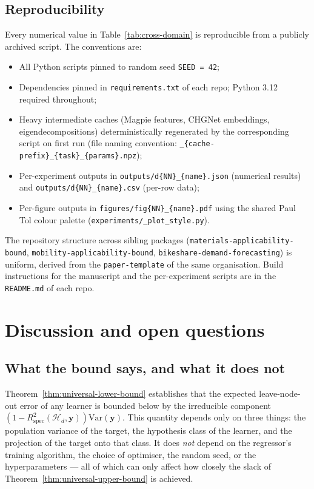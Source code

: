 \documentclass[11pt,a4paper]{article}
\theoremstyle{plain}
\theoremstyle{definition}
\theoremstyle{remark}
\newcommand{\by}{\mathbf{y}}
\newcommand{\Var}{\mathrm{Var}}
\newcommand{\Rspec}{R^2_{\mathrm{spec}}}
\newcommand{\Hcal}{\mathcal{H}}
\begin{document}
\subsection{Reproducibility}
\label{subsec:emp-reproducibility}

Every numerical value in Table~\ref{tab:cross-domain} is reproducible
from a publicly archived script.  The conventions are:

\begin{itemize}[label=$\bullet$,leftmargin=*]
\item All Python scripts pinned to random seed \texttt{SEED = 42};
\item Dependencies pinned in \texttt{requirements.txt} of each repo;
    Python 3.12 required throughout;
\item Heavy intermediate caches (Magpie features, CHGNet embeddings,
    eigendecompositions) deterministically regenerated by the
    corresponding script on first run (file naming convention:
    \texttt{\_\{cache-prefix\}\_\{task\}\_\{params\}.npz});
\item Per-experiment outputs in \texttt{outputs/d\{NN\}\_\{name\}.json}
    (numerical results) and \texttt{outputs/d\{NN\}\_\{name\}.csv}
    (per-row data);
\item Per-figure outputs in \texttt{figures/fig\{NN\}\_\{name\}.pdf}
    using the shared Paul Tol colour palette
    (\texttt{experiments/\_plot\_style.py}).
\end{itemize}

The repository structure across sibling packages
(\texttt{materials-applicability-bound},
\texttt{mobility-applicability-bound},
\texttt{bikeshare-demand-forecasting}) is uniform, derived from the
\texttt{paper-template} of the same organisation.  Build instructions
for the manuscript and the per-experiment scripts are in the
\texttt{README.md} of each repo.

\section{Discussion and open questions}
\label{sec:discussion}

\subsection{What the bound says, and what it does not}

Theorem~\ref{thm:universal-lower-bound} establishes that the expected
leave-node-out error of any learner is bounded below by the irreducible
component $(1 - \Rspec(\Hcal_d, \by)) \Var(\by)$.  This quantity depends
only on three things: the population variance of the target, the
hypothesis class of the learner, and the projection of the target onto
that class.  It does \emph{not} depend on the regressor's training
algorithm, the choice of optimiser, the random seed, or the
hyperparameters --- all of which can only affect how closely the slack
of Theorem~\ref{thm:universal-upper-bound} is achieved.
\end{document}
